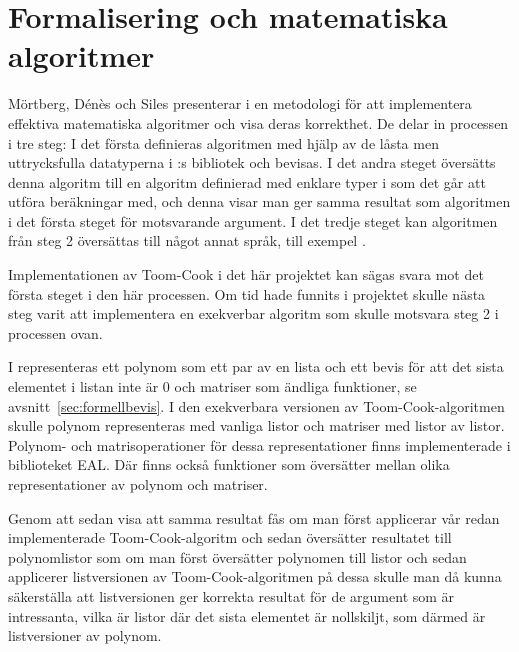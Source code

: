 \section{Formalisering och matematiska algoritmer}
\label{sec:exekverbar}
Mörtberg, Dénès och Siles presenterar i \cite{denes2012refinement} en metodologi för att
implementera effektiva matematiska algoritmer och visa deras korrekthet.
De delar in processen i tre steg: I det första definieras algoritmen med hjälp av de
låsta men uttrycksfulla datatyperna i \ssr{}:s bibliotek och bevisas. I det andra
steget översätts denna algoritm till en algoritm definierad med enklare typer i \ssr{}
som det går att utföra beräkningar med, och denna visar man ger samma resultat som
algoritmen i det första steget för motsvarande argument. I det tredje steget kan
algoritmen från steg 2 översättas till något annat språk, till exempel \haskell{}.

Implementationen av Toom-Cook i det här projektet kan sägas svara mot det
första steget i den här processen. Om tid hade funnits i projektet skulle nästa
steg varit att implementera en exekverbar algoritm som skulle motsvara steg 2 i
processen ovan.

I \ssr{} representeras ett polynom som ett par av en lista och ett bevis för
att det sista elementet i listan inte är 0 och matriser som ändliga funktioner,
se avsnitt~\ref{sec:formellbevis}. I den exekverbara versionen av
Toom-Cook-algoritmen skulle polynom representeras med vanliga listor och
matriser med listor av listor. Polynom- och matrisoperationer för dessa
representationer finns implementerade i biblioteket \coq{}EAL\cite{coqeal}. Där
finns också funktioner som översätter mellan olika representationer av polynom
och matriser.

Genom att sedan visa att samma resultat fås om man först applicerar vår redan
implementerade Toom-Cook-algoritm och sedan översätter resultatet till
polynomlistor som om man först översätter polynomen till listor och sedan
applicerer listversionen av Toom-Cook-algoritmen på dessa skulle man då kunna
säkerställa att listversionen ger korrekta resultat för de argument som är
intressanta, vilka är listor där det sista elementet är nollskiljt, som därmed
är listversioner av polynom.

